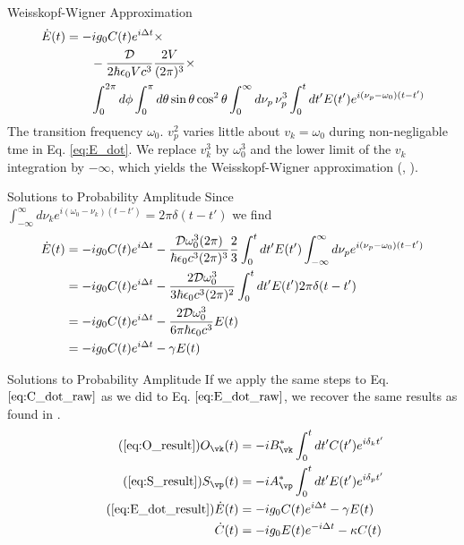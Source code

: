 \begin{frame}{Weisskopf-Wigner Approximation }
    \begin{align}
        \label{eq:E_dot}
        \Dot{E}(t) &= -i g_0 C(t) e^{i\Delta t} \times \\ \notag
        &\qquad -  \frac{\mathcal{D}}{2 \hbar \epsilon_0 Vc^3} \frac{2 V}{(2 \pi)^3} \times \\ \notag 
        &\qquad \int_0^{2\pi} d\phi \int_0^{\pi} d\theta \sin \theta \cos^2 \theta \int_0^\infty d\nu_p\, \nu_p^3 \int_0^t dt' E(t')e^{i(\nu_p - \omega_0)(t-t')} 
    \end{align}
    The transition frequency $\omega_0$. $v_p^2$ varies  little about $v_k = \omega_0$ during non-negligable tme in Eq. \eqref{eq:E_dot}. We replace $v_k^3$ by  $\omega_0^3$ and the lower limit of the $v_k$ integration by $-\infty$, which yields the Weisskopf-Wigner approximation (\citep{Scully1997}, \citep{Weisskopf1930}). 
\end{frame}

\begin{frame}{Solutions to Probability Amplitude}
    Since $\int_{-\infty}^{\infty}d \nu_k e^{i(\omega_0 - \nu_k)(t-t')}= 2\pi \delta(t-t')$ we find
    \begin{align}   
        \notag
        \Dot{E}(t) &= -i g_0 C(t) e^{i \Delta t} - \frac{\mathcal{D} \omega_0^3 (2 \pi)}{\hbar \epsilon_0 c^3 (2\pi)^3}\frac{2}{3}\int_0^t dt' E(t') \int_{-\infty}^{\infty}d\nu_p e^{i(\nu_p-\omega_0)(t-t')}\\ \notag
        &= -i g_0 C(t) e^{i \Delta t} -\frac{2\mathcal{D} \omega_0^3 }{3\hbar \epsilon_0 c^3 (2\pi)^2} \int_0^t dt' E(t') 2\pi \delta(t-t')\\ \notag
        &= -i g_0 C(t) e^{i \Delta t} -\frac{2\mathcal{D} \omega_0^3 }{6\pi \hbar \epsilon_0 c^3 }E(t)\\
        &= -i g_0 C(t) e^{i \Delta t} -\gamma E(t) \label{eq:E_dot_result}
    \end{align}
\end{frame}

\begin{frame}{Solutions to Probability Amplitude}
    If we apply the same steps to Eq. $\eqref{eq:C_dot_raw}$ as we did to Eq. $\eqref{eq:E_dot_raw}$, we recover the same results as found in \citep{Cui2006}.
    \begin{align}
        \tag{\ref{eq:O_result}}
        O_{\vk}(t) &= -i B^{*}_{\vk} \int_0^t dt' C(t') e^{i \delta_{k} t'}\\\tag{\ref{eq:S_result}}
        S_{\vp}(t) &= -i A^{*}_{\vp} \int_0^t dt' E(t')  e^{i\delta_p t'}\\\tag{\ref{eq:E_dot_result}}
        \Dot{E}(t) &= -i g_0 C(t) e^{i \Delta t} -\gamma E(t) \\
        \Dot{C}(t) &= -i g_0 E(t) e^{-i \Delta t} - \kappa C(t) \label{eq:C_dot_result}        
    \end{align}
\end{frame}


